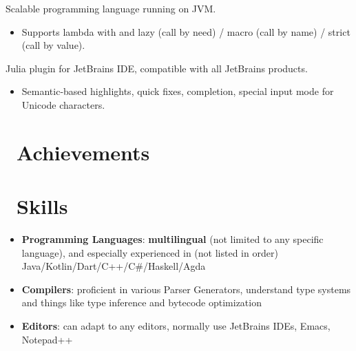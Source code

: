 \documentclass{style/resume2}
\begin{document}
Scalable programming language running on JVM.
\begin{itemize}
  \item Supports lambda with and lazy (call by need) / macro (call by name) / strict (call by value).
\end{itemize}

Julia plugin for JetBrains IDE, compatible with all JetBrains products.
\begin{itemize}
  \item Semantic-based highlights, quick fixes, completion, special input mode for Unicode characters.
\end{itemize}


\section{\faHeartO\ Achievements}

\section{\faCogs\ Skills}
\begin{itemize}[parsep=0.5ex]
  \item \textbf{Programming Languages}:
    \textbf{multilingual} (not limited to any specific language),
    and especially experienced in (not listed in order) Java/Kotlin/Dart/C++/C\#/Haskell/Agda

  \item \textbf{Compilers}:
    proficient in various Parser Generators, understand type systems and things like type inference and bytecode optimization

  \item \textbf{Editors}:
    can adapt to any editors, normally use JetBrains IDEs, Emacs, Notepad++
\end{itemize}
\end{document}

